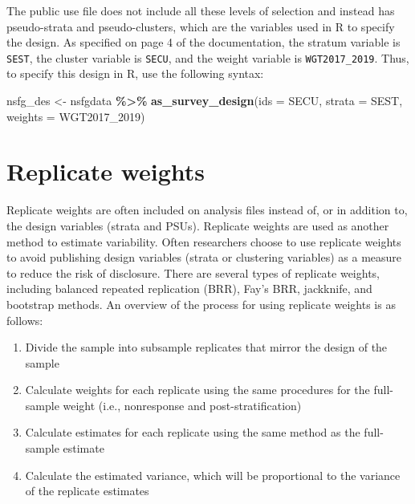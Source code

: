 \documentclass[
]{krantz}
\makeatletter
\newenvironment{Shaded}{\begin{snugshade}}{\end{snugshade}}
\newcommand{\AttributeTok}[1]{\textcolor[rgb]{0.27,0.27,0.27}{#1}}
\newcommand{\FunctionTok}[1]{\textcolor[rgb]{0.27,0.27,0.27}{\textbf{#1}}}
\newcommand{\NormalTok}[1]{#1}
\newcommand{\OtherTok}[1]{\textcolor[rgb]{0.37,0.37,0.37}{#1}}
\newcommand{\SpecialCharTok}[1]{\textcolor[rgb]{0.43,0.43,0.43}{\textbf{#1}}}
\providecommand{\tightlist}{%
  \setlength{\itemsep}{0pt}\setlength{\parskip}{0pt}}
\newenvironment{kframe}{%
\medskip{}
\setlength{\fboxsep}{.8em}
 \def\at@end@of@kframe{}%
 \ifinner\ifhmode%
  \def\at@end@of@kframe{\end{minipage}}%
  \begin{minipage}{\columnwidth}%
 \fi\fi%
 \def\FrameCommand##1{\hskip\@totalleftmargin \hskip-\fboxsep
 \colorbox{shadecolor}{##1}\hskip-\fboxsep
     \hskip-\linewidth \hskip-\@totalleftmargin \hskip\columnwidth}%
 \MakeFramed {\advance\hsize-\width
   \@totalleftmargin\z@ \linewidth\hsize
   \@setminipage}}%
 {\par\unskip\endMakeFramed%
 \at@end@of@kframe}
\renewenvironment{Shaded}{\begin{kframe}}{\end{kframe}}
\makeatother
\begin{document}
The public use file does not include all these levels of selection and instead has pseudo-strata and pseudo-clusters, which are the variables used in R to specify the design. As specified on page 4 of the documentation, the stratum variable is \texttt{SEST}, the cluster variable is \texttt{SECU}, and the weight variable is \texttt{WGT2017\_2019}. Thus, to specify this design in R, use the following syntax:

\begin{Shaded}
\begin{Highlighting}[]
\NormalTok{nsfg\_des }\OtherTok{\textless{}{-}}\NormalTok{ nsfgdata }\SpecialCharTok{\%\textgreater{}\%}
  \FunctionTok{as\_survey\_design}\NormalTok{(}\AttributeTok{ids =}\NormalTok{ SECU,}
                   \AttributeTok{strata =}\NormalTok{ SEST,}
                   \AttributeTok{weights =}\NormalTok{ WGT2017\_2019)}
\end{Highlighting}
\end{Shaded}

\hypertarget{replicate-weights}{%
\section{Replicate weights}\label{replicate-weights}}

Replicate weights are often included on analysis files instead of, or in addition to, the design variables (strata and PSUs). Replicate weights are used as another method to estimate variability. Often researchers choose to use replicate weights to avoid publishing design variables (strata or clustering variables) as a measure to reduce the risk of disclosure. There are several types of replicate weights, including balanced repeated replication (BRR), Fay's BRR, jackknife, and bootstrap methods. An overview of the process for using replicate weights is as follows:

\begin{enumerate}
\def\labelenumi{\arabic{enumi}.}
\tightlist
\item
  Divide the sample into subsample replicates that mirror the design of the sample
\item
  Calculate weights for each replicate using the same procedures for the full-sample weight (i.e., nonresponse and post-stratification)
\item
  Calculate estimates for each replicate using the same method as the full-sample estimate
\item
  Calculate the estimated variance, which will be proportional to the variance of the replicate estimates
\end{enumerate}
\end{document}
